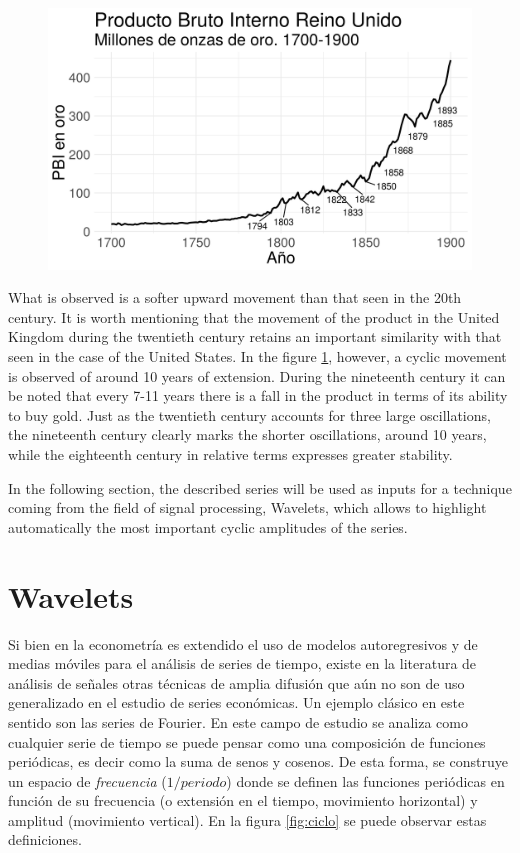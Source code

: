 \documentclass[a4paper]{article}
\begin{document}
\begin{figure}[H]
	\centering
	\includegraphics[width=0.75\linewidth]{uk_gdp.png}
	\caption{} 
	\label{fig:uk_gdp}
\end{figure}


What is observed is a softer upward movement than that seen in the 20th century. It is worth mentioning that the movement of the product in the United Kingdom during the twentieth century retains an important similarity with that seen in the case of the United States. In the figure \ref{fig:uk_gdp}, however, a cyclic movement is observed of around 10 years of extension. During the nineteenth century it can be noted that every 7-11 years there is a fall in the product in terms of its ability to buy gold. Just as the twentieth century accounts for three large oscillations, the nineteenth century clearly marks the shorter oscillations, around 10 years, while the eighteenth century in relative terms expresses greater stability.

In the following section, the described series will be used as inputs for a technique coming from the field of signal processing, Wavelets, which allows to highlight automatically the most important cyclic amplitudes of the series.

\section{Wavelets}

Si bien en la econometría es extendido el uso de modelos autoregresivos y de medias móviles para el análisis de series de tiempo, existe en la literatura de análisis de señales otras técnicas de amplia difusión que aún no son de uso generalizado en el estudio de series económicas. Un ejemplo clásico en este sentido son las series de Fourier. En este campo de estudio se analiza como cualquier serie de tiempo se puede pensar como una composición de funciones periódicas, es decir como la suma de senos y cosenos. De esta forma, se construye un espacio de \textit{frecuencia} ($1/periodo$) donde se definen las funciones periódicas en función de su frecuencia (o extensión en el tiempo, movimiento horizontal) y amplitud (movimiento vertical). En la figura \ref{fig:ciclo} se puede observar estas definiciones.
\end{document}
